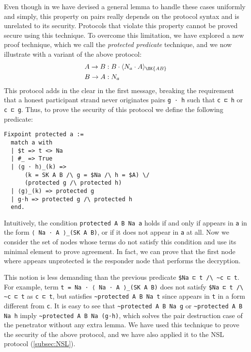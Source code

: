Even though in \easystrands{} we have devised a general lemma to handle these cases uniformly and simply, this property on pairs really depends on the protocol syntax and is unrelated to its security.
Protocols that violate this property cannot be proved secure using this technique.
To overcome this limitation, we have explored a new proof technique, which we call the \emph{protected predicate} technique, and we now illustrate with a variant of the above protocol:
\begin{align*}
  A \rightarrow B & : B \cdot \enc{N_a \cdot A}{\SK{AB}} \\
  B \rightarrow A & : N_a
\end{align*}
This protocol adds \B in the clear in the first message, breaking the requirement that a honest participant strand never originates pairs \lstinline|g ⋅ h| such that \lstinline{c ⊏ h} or \lstinline|c ⊏ g|.
Thus, to prove the security of this protocol we define the following predicate:

\begin{lstlisting}
Fixpoint protected a :=
  match a with
  | $t => t <> Na
  | #_ => True
  | ⟨g ⋅ h⟩_(k) =>
      (k = SK A B /\ g = $Na /\ h = $A) \/
      (protected g /\ protected h)
  | ⟨g⟩_(k) => protected g
  | g⋅h => protected g /\ protected h
  end.
\end{lstlisting}
Intuitively, the condition \lstinline|protected A B Na a| holds if and only if \Na appears in \lstinline|a| in the form \lstinline|⟨ Na ⋅ A ⟩_(SK A B)|, or if it does not appear in \lstinline|a| at all.
Now we consider the set of nodes whose terms do not satisfy this condition and use its minimal element to prove agreement.
In fact,
we can prove that the first node where \Na appears unprotected is the responder node that performs the decryption.

This notion is less demanding than the previous predicate \lstinline|$Na ⊏ t /\ ~c ⊏ t|.
For example, term \lstinline|t = Na ⋅ ⟨ Na ⋅ A ⟩_(SK A B)| does not satisfy \lstinline|$Na ⊏ t /\ ~c ⊏ t| as \lstinline|c ⊏ t|, but satisfies \lstinline|~protected A B Na t| since \Na appears in \lstinline|t| in a form different from \lstinline|c|.
It is easy to see that \lstinline|~protected A B Na g| or \lstinline{~protected A B Na h} imply \lstinline|~protected A B Na (g⋅h)|, which solves the pair destruction case of the penetrator without any extra lemma.
We have used this technique to prove the security of the above protocol, and we have also applied it to the NSL protocol (\cref{subsec:NSL}).

